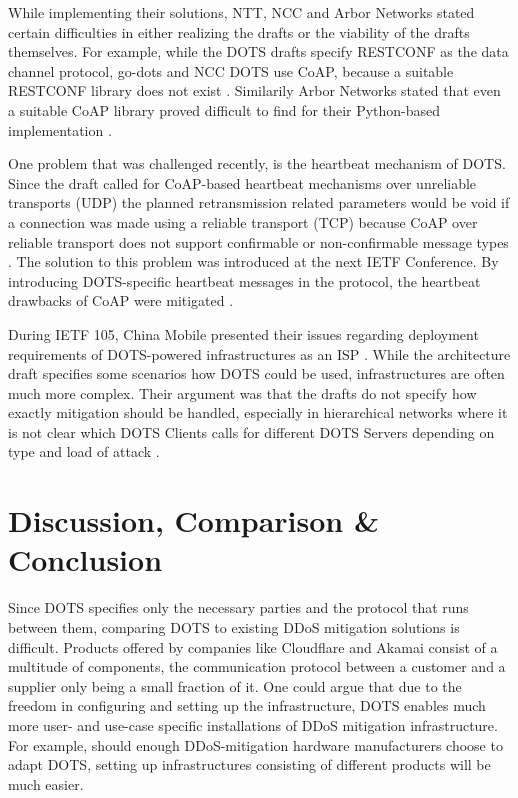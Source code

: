 While implementing their solutions, NTT, NCC and Arbor Networks stated certain difficulties in either realizing the drafts or the viability of the drafts themselves. For example, while the DOTS drafts specify RESTCONF as the data channel protocol, go-dots and NCC DOTS use CoAP, because a suitable RESTCONF library does not exist \cite{hackathon-99}. Similarily Arbor Networks stated that even a suitable CoAP library proved difficult to find for their Python-based implementation \cite{arbor-101}.

One problem that was challenged recently, is the heartbeat mechanism of DOTS. Since the draft called for CoAP-based heartbeat mechanisms over unreliable transports (UDP) the planned retransmission related parameters would be void if a connection was made using a reliable transport (TCP) because CoAP over reliable transport does not support confirmable or non-confirmable message types \cite{heartbeat-challenge}. The solution to this problem was introduced at the next IETF Conference. By introducing DOTS-specific heartbeat messages in the protocol, the heartbeat drawbacks of CoAP were mitigated \cite{heartbeat-solution}.

During IETF 105, China Mobile presented their issues regarding deployment requirements of DOTS-powered infrastructures as an ISP \cite{china-mobile-105}. While the architecture draft specifies some scenarios how DOTS could be used, infrastructures are often much more complex. Their argument was that the drafts do not specify how exactly mitigation should be handled, especially in hierarchical networks where it is not clear which DOTS Clients calls for different DOTS Servers depending on type and load of attack \cite{chen-deployment}.


\section{Discussion, Comparison \& Conclusion}

Since DOTS specifies only the necessary parties and the protocol that runs between them, comparing DOTS to existing DDoS mitigation solutions is difficult. Products offered by companies like Cloudflare and Akamai consist of a multitude of components, the communication protocol between a customer and a supplier only being a small fraction of it. One could argue that due to the freedom in configuring and setting up the infrastructure, DOTS enables much more user- and use-case specific installations of DDoS mitigation infrastructure. For example, should enough DDoS-mitigation hardware manufacturers choose to adapt DOTS, setting up infrastructures consisting of different products will be much easier.

